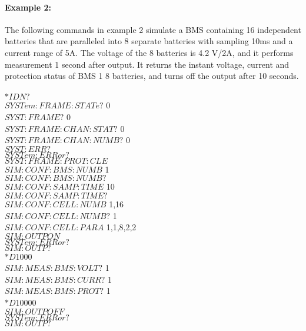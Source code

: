 \paragraph{Example 2:} The following commands in example 2 simulate a BMS containing 16 independent batteries that are paralleled into 8 separate batteries with sampling 10ms and a current range of 5A. The voltage of the 8 batteries is 4.2 V/2A, and it performs measurement 1 second after output. It returns the instant voltage, current and protection status of BMS 1 8 batteries, and turns off the output after 10 seconds.
\\\\
$*IDN?$ \\
$SYSTem:FRAME:STATe?$ 0\\
$SYST:FRAME?$ 0\\
$SYST:FRAME:CHAN:STAT?$ 0\\
$SYST:FRAME:CHAN:NUMB?$ 0 \\
$SYST:ERR?$\\
$SYSTem:ERRor?$\\ 
$SYST:FRAME:PROT:CLE$\\
$SIM:CONF:BMS:NUMB$ 1\\ 
$SIM:CONF:BMS:NUMB?$ \\
$SIM:CONF:SAMP:TIME$ 10\\ 
$SIM:CONF:SAMP:TIME?$\\ 
$SIM:CONF:CELL:NUMB$ 1,16\\
$SIM:CONF:CELL:NUMB?$ 1\\
$SIM:CONF:CELL:PARA$ 1,1,8,2,2\\
$SIM:OUTP ON$\\
$SYSTem:ERRor?$ \\
$SIM:OUTP?$\\
$*D $1000\\
$SIM:MEAS:BMS:VOLT?$ 1\\
$SIM:MEAS:BMS:CURR?$ 1\\
$SIM:MEAS:BMS:PROT?$ 1\\
$*D $10000\\
$SIM:OUTP OFF$\\
$SYSTem:ERRor?$\\
$SIM:OUTP?$\\